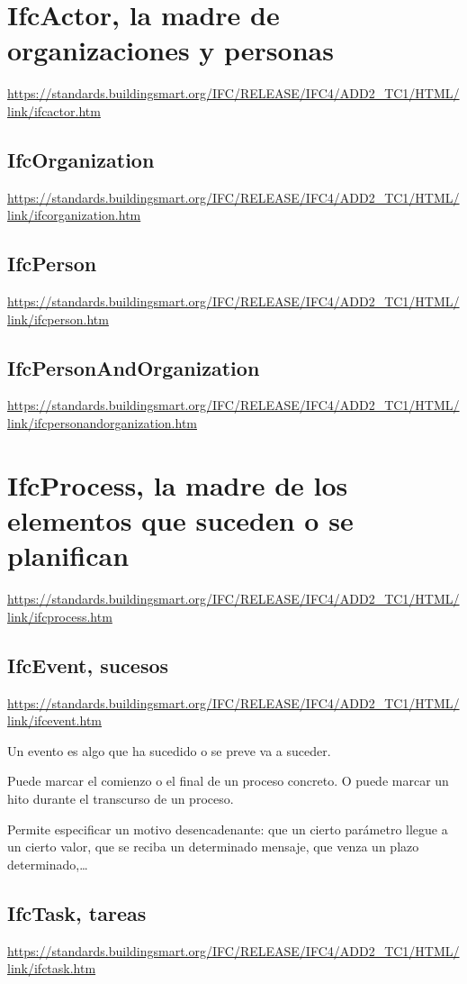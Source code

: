 \documentclass[spanish,12pt,a4paper,final,oneside]{book}
\begin{document}
\section{IfcActor, la madre de organizaciones y personas}
\url{https://standards.buildingsmart.org/IFC/RELEASE/IFC4/ADD2_TC1/HTML/link/ifcactor.htm}

\subsection{IfcOrganization}
\url{https://standards.buildingsmart.org/IFC/RELEASE/IFC4/ADD2_TC1/HTML/link/ifcorganization.htm}

\subsection{IfcPerson}
\url{https://standards.buildingsmart.org/IFC/RELEASE/IFC4/ADD2_TC1/HTML/link/ifcperson.htm}

\subsection{IfcPersonAndOrganization}
\url{https://standards.buildingsmart.org/IFC/RELEASE/IFC4/ADD2_TC1/HTML/link/ifcpersonandorganization.htm}




\section{IfcProcess, la madre de los elementos que suceden o se planifican}
\url{https://standards.buildingsmart.org/IFC/RELEASE/IFC4/ADD2_TC1/HTML/link/ifcprocess.htm}

\subsection{IfcEvent, sucesos}
\url{https://standards.buildingsmart.org/IFC/RELEASE/IFC4/ADD2_TC1/HTML/link/ifcevent.htm}

Un evento es algo que ha sucedido o se preve va a suceder.

Puede marcar el comienzo o el final de un proceso concreto. O puede marcar un hito durante el transcurso de un proceso.

Permite especificar un motivo desencadenante: que un cierto parámetro llegue a un cierto valor, que se reciba un determinado mensaje, que venza un plazo determinado,\ldots 

\subsection{IfcTask, tareas}
\url{https://standards.buildingsmart.org/IFC/RELEASE/IFC4/ADD2_TC1/HTML/link/ifctask.htm}
\end{document}
